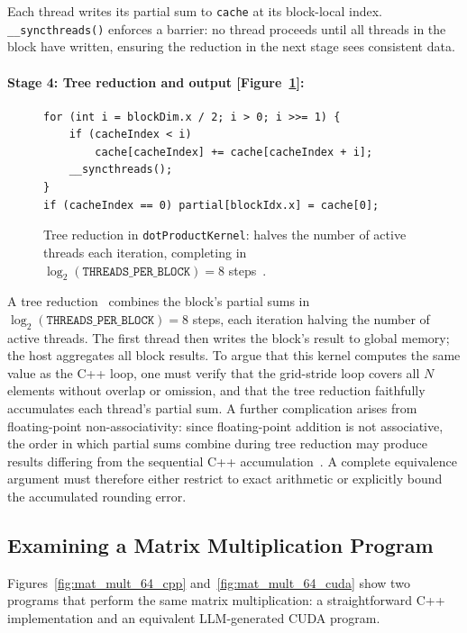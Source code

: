\documentclass{article}
\begin{document}
Each thread writes its partial sum to \texttt{cache} at its block-local index. \texttt{\_\_syncthreads()} enforces a barrier: no thread proceeds until all threads in the block have written, ensuring the reduction in the next stage sees consistent data.

\paragraph{Stage 4: Tree reduction and output [Figure~\ref{fig:cuda_reduction}]:}

\begin{figure}[H]
\begin{verbatim}
for (int i = blockDim.x / 2; i > 0; i >>= 1) {
    if (cacheIndex < i)
        cache[cacheIndex] += cache[cacheIndex + i];
    __syncthreads();
}
if (cacheIndex == 0) partial[blockIdx.x] = cache[0];
\end{verbatim}
    \caption{Tree reduction in \texttt{dotProductKernel}: halves the number of active threads each iteration, completing in $\log_2(\texttt{THREADS\_PER\_BLOCK}) = 8$ steps~\cite{harris2007optimizing}.}
    \label{fig:cuda_reduction}
\end{figure}

A tree reduction~\cite{harris2007optimizing} combines the block's partial sums in $\log_2(\texttt{THREADS\_PER\_BLOCK}) = 8$ steps, each iteration halving the number of active threads. The first thread then writes the block's result to global memory; the host aggregates all block results. To argue that this kernel computes the same value as the C++ loop, one must verify that the grid-stride loop covers all $N$ elements without overlap or omission, and that the tree reduction faithfully accumulates each thread's partial sum. A further complication arises from floating-point non-associativity: since floating-point addition is not associative, the order in which partial sums combine during tree reduction may produce results differing from the sequential C++ accumulation~\cite{shanmugavelu2024fpna}. A complete equivalence argument must therefore either restrict to exact arithmetic or explicitly bound the accumulated rounding error.

\subsection{Examining a Matrix Multiplication Program}

Figures~\ref{fig:mat_mult_64_cpp} and~\ref{fig:mat_mult_64_cuda} show two programs that perform the same matrix multiplication: a straightforward C++ implementation and an equivalent LLM-generated CUDA program.
\end{document}
